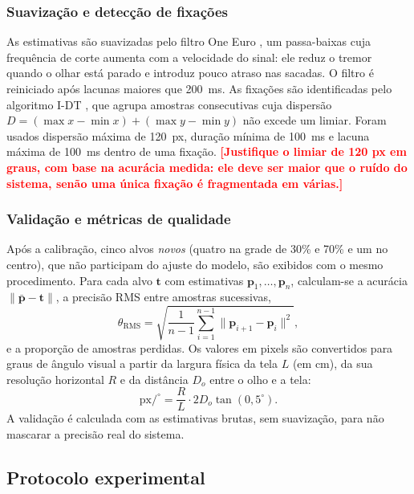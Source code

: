 \documentclass[sigconf, nonacm, language=english, language=portuguese, natbib=false]{acmart}
\newcommand{\pendente}[1]{\textcolor{red}{\textbf{[#1]}}}
\begin{document}
\subsubsection{Suavização e detecção de fixações}
As estimativas são suavizadas pelo filtro One Euro \cite{casiez2012}, um passa-baixas cuja frequência de corte aumenta com a velocidade do sinal: ele reduz o tremor quando o olhar está parado e introduz pouco atraso nas sacadas. O filtro é reiniciado após lacunas maiores que 200~ms. As fixações são identificadas pelo algoritmo I-DT \cite{salvucci2000identifying}, que agrupa amostras consecutivas cuja dispersão $D = (\max x - \min x) + (\max y - \min y)$ não excede um limiar. Foram usados dispersão máxima de 120~px, duração mínima de 100~ms e lacuna máxima de 100~ms dentro de uma fixação. \pendente{Justifique o limiar de 120 px em graus, com base na acurácia medida: ele deve ser maior que o ruído do sistema, senão uma única fixação é fragmentada em várias.}

\subsubsection{Validação e métricas de qualidade}
Após a calibração, cinco alvos \emph{novos} (quatro na grade de 30\% e 70\% e um no centro), que não participam do ajuste do modelo, são exibidos com o mesmo procedimento. Para cada alvo $\mathbf{t}$ com estimativas $\mathbf{p}_1, \dots, \mathbf{p}_n$, calculam-se \cite{holmqvist2012quality} a acurácia $\lVert \bar{\mathbf{p}} - \mathbf{t} \rVert$, a precisão RMS entre amostras sucessivas,
\begin{equation}
  \theta_{\mathrm{RMS}} = \sqrt{\frac{1}{n-1}\sum_{i=1}^{n-1} \lVert \mathbf{p}_{i+1} - \mathbf{p}_i \rVert^2},
\end{equation}
e a proporção de amostras perdidas. Os valores em pixels são convertidos para graus de ângulo visual a partir da largura física da tela $L$ (em cm), da sua resolução horizontal $R$ e da distância $D_o$ entre o olho e a tela:
\begin{equation}
  \text{px}/^\circ = \frac{R}{L} \cdot 2 D_o \tan(0{,}5^\circ).
\end{equation}
A validação é calculada com as estimativas brutas, sem suavização, para não mascarar a precisão real do sistema.

\subsection{Protocolo experimental}
\end{document}
